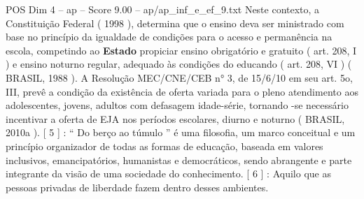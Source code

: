 \begin{textsample}{POS Dim 4 – ap – Score 9.00 – ap/ap\_inf\_e\_ef\_9.txt}
Neste contexto, a Constituição Federal ( 1998 ), determina que o ensino deva ser ministrado com base no princípio da igualdade de condições para o acesso e permanência na escola, competindo ao \textbf{Estado} propiciar ensino obrigatório e gratuito ( art. 208, I ) e ensino noturno regular, adequado às condições do educando ( art. 208, VI ) ( BRASIL, 1988 ).
A Resolução MEC/CNE/CEB n{\EmojiFont °} 3, de 15/6/10 em seu art. 5o, III, prevê a condição da existência de oferta variada para o pleno atendimento aos adolescentes, jovens, adultos com defasagem idade-série, tornando -se necessário incentivar a oferta de EJA nos períodos escolares, diurno e noturno ( BRASIL, 2010a ). [ 5 ] : “ Do berço ao túmulo ” é uma filosofia, um marco conceitual e um princípio organizador de todas as formas de educação, baseada em valores inclusivos, emancipatórios, humanistas e democráticos, sendo abrangente e parte integrante da visão de uma sociedade do conhecimento. [ 6 ] : Aquilo que as pessoas privadas de liberdade fazem dentro desses ambientes.

\end{textsample}
